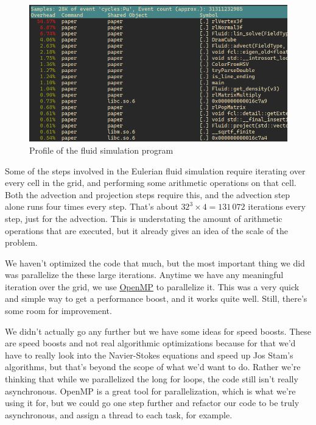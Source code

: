 \documentclass[a4paper,12pt,titlepage]{article}
\begin{document}
\begin{figure}[H]
	\centering
	\includegraphics[width=\textwidth]{resources/profile.png}
	\caption{Profile of the fluid simulation program}
\end{figure}

Some of the steps involved in the Eulerian fluid simulation require iterating
over every cell in the grid, and performing some arithmetic operations on that cell.
Both the advection and projection steps require this, and the advection step
alone runs four times every step. That's about $32^3 \times 4 = 131\,072$ iterations
every step, just for the advection. This is understating the amount of arithmetic
operations that are executed, but it already gives an idea of the scale of the
problem.

We haven't optimized the code that much, but the most important thing we did was
parallelize the these large iterations. Anytime we have any meaningful iteration
over the grid, we use \href{www.openmp.org}{OpenMP} to parallelize it. This was
a very quick and simple way to get a performance boost, and it works quite well.
Still, there's some room for improvement.

We didn't actually go any further but we have some ideas for speed boosts. These
are speed boosts and not real algorithmic optimizations because for that we'd have
to really look into the Navier-Stokes equations and speed up Jos Stam's algorithms,
but that's beyond the scope of what we'd want to do. Rather we're thinking that
while we parallelized the long for loops, the code still isn't really asynchronous.
OpenMP is a great tool for parallelization, which is what we're using it for,
but we could go one step further and refactor our code to be truly asynchronous,
and assign a thread to each task, for example.
\end{document}
